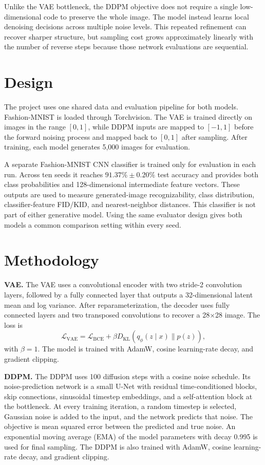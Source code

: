 \documentclass{article}
\begin{document}
Unlike the VAE bottleneck, the DDPM objective does not require a single low-dimensional code to preserve the whole image. The model instead learns local denoising decisions across multiple noise levels. This repeated refinement can recover sharper structure, but sampling cost grows approximately linearly with the number of reverse steps because those network evaluations are sequential.

\section{Design}
The project uses one shared data and evaluation pipeline for both models. Fashion-MNIST is loaded through Torchvision. The VAE is trained directly on images in the range $[0,1]$, while DDPM inputs are mapped to $[-1,1]$ before the forward noising process and mapped back to $[0,1]$ after sampling. After training, each model generates 5,000 images for evaluation.

A separate Fashion-MNIST CNN classifier is trained only for evaluation in each run. Across ten seeds it reaches $91.37\% \pm 0.20\%$ test accuracy and provides both class probabilities and 128-dimensional intermediate feature vectors. These outputs are used to measure generated-image recognizability, class distribution, classifier-feature FID/KID, and nearest-neighbor distances. This classifier is not part of either generative model. Using the same evaluator design gives both models a common comparison setting within every seed.

\section{Methodology}
\textbf{VAE.} The VAE uses a convolutional encoder with two stride-2 convolution layers, followed by a fully connected layer that outputs a 32-dimensional latent mean and log variance. After reparameterization, the decoder uses fully connected layers and two transposed convolutions to recover a 28$\times$28 image. The loss is
\begin{equation}
 \mathcal{L}_{\mathrm{VAE}}=\mathcal{L}_{\mathrm{BCE}}+\beta D_{\mathrm{KL}}(q_\phi(z\mid x)\|p(z)),
\end{equation}
with $\beta=1$. The model is trained with AdamW, cosine learning-rate decay, and gradient clipping.

\textbf{DDPM.} The DDPM uses 100 diffusion steps with a cosine noise schedule. Its noise-prediction network is a small U-Net with residual time-conditioned blocks, skip connections, sinusoidal timestep embeddings, and a self-attention block at the bottleneck. At every training iteration, a random timestep is selected, Gaussian noise is added to the input, and the network predicts that noise. The objective is mean squared error between the predicted and true noise. An exponential moving average (EMA) of the model parameters with decay 0.995 is used for final sampling. The DDPM is also trained with AdamW, cosine learning-rate decay, and gradient clipping.
\end{document}

